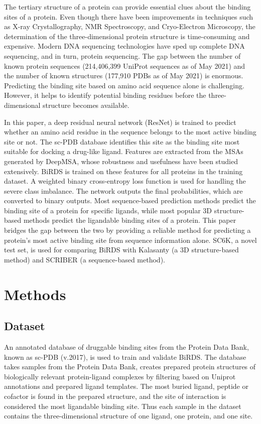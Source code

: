 \documentclass[journal=jcisd8,manuscript=article]{achemso}
\begin{document}
The tertiary structure of a protein can provide essential clues about the binding sites of a protein. Even though there have been improvements in techniques such as X-ray Crystallography, NMR Spectroscopy, and Cryo-Electron Microscopy, the determination of the three-dimensional protein structure is time-consuming and expensive. Modern DNA sequencing technologies have sped up complete DNA sequencing, and in turn, protein sequencing. The gap between the number of known protein sequences (214,406,399 UniProt sequences as of May 2021)\cite{10.1093/nar/gkaa1100} and the number of known structures (177,910 PDBs as of May 2021)\cite{berman2000protein}\cite{burley2021rcsb} is enormous. Predicting the binding site based on amino acid sequence alone is challenging. However, it helps to identify potential binding residues before the three-dimensional structure becomes available.

In this paper, a deep residual neural network (ResNet)\cite{he2016deep} is trained to predict whether an amino acid residue in the sequence belongs to the most active binding site or not. The sc-PDB database identifies this site as the binding site most suitable for docking a drug-like ligand. Features are extracted from the MSAs generated by DeepMSA\cite{zhang2020deepmsa}, whose robustness and usefulness have been studied extensively. BiRDS is trained on these features for all proteins in the training dataset. A weighted binary cross-entropy loss function is used for handling the severe class imbalance. The network outputs the final probabilities, which are converted to binary outputs. Most sequence-based prediction methods predict the binding site of a protein for specific ligands, while most popular 3D structure-based methods predict the ligandable binding sites of a protein. This paper bridges the gap between the two by providing a reliable method for predicting a protein's most active binding site from sequence information alone. SC6K, a novel test set, is used for comparing BiRDS with Kalasanty (a 3D structure-based method) and SCRIBER (a sequence-based method).

\section{Methods}
\subsection{Dataset}
\quad An annotated database of druggable binding sites from the Protein Data Bank, known as sc-PDB (v.2017)\cite{desaphy2015sc}, is used to train and validate BiRDS. The database takes samples from the Protein Data Bank\cite{berman2000protein,berman2003announcing}, creates prepared protein structures of biologically relevant protein-ligand complexes by filtering based on Uniprot annotations and prepared ligand templates. The most buried ligand, peptide or cofactor is found in the prepared structure, and the site of interaction is considered the most ligandable binding site. Thus each sample in the dataset contains the three-dimensional structure of one ligand, one protein, and one site.
\end{document}
